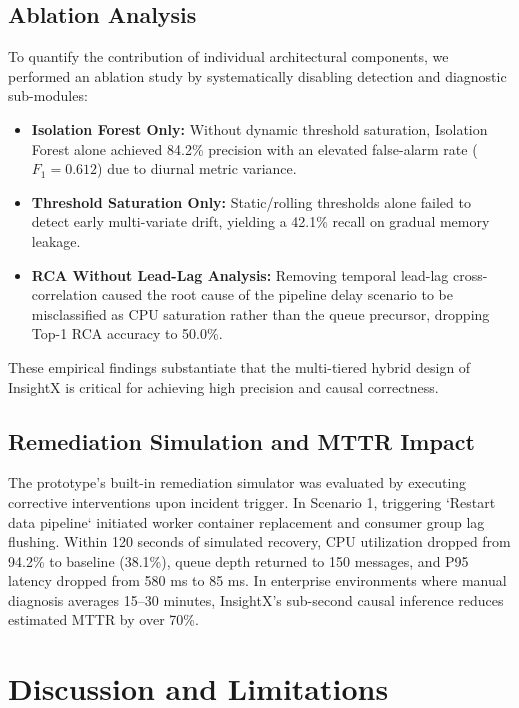 \documentclass[conference]{IEEEtran}
\begin{document}
\subsection{Ablation Analysis}
To quantify the contribution of individual architectural components, we performed an ablation study by systematically disabling detection and diagnostic sub-modules:
\begin{itemize}
    \item \textbf{Isolation Forest Only:} Without dynamic threshold saturation, Isolation Forest alone achieved 84.2\% precision with an elevated false-alarm rate ($F_1 = 0.612$) due to diurnal metric variance.
    \item \textbf{Threshold Saturation Only:} Static/rolling thresholds alone failed to detect early multi-variate drift, yielding a 42.1\% recall on gradual memory leakage.
    \item \textbf{RCA Without Lead-Lag Analysis:} Removing temporal lead-lag cross-correlation caused the root cause of the pipeline delay scenario to be misclassified as CPU saturation rather than the queue precursor, dropping Top-1 RCA accuracy to 50.0\%.
\end{itemize}
These empirical findings substantiate that the multi-tiered hybrid design of InsightX is critical for achieving high precision and causal correctness.

\subsection{Remediation Simulation and MTTR Impact}
The prototype's built-in remediation simulator was evaluated by executing corrective interventions upon incident trigger. In Scenario 1, triggering `Restart data pipeline` initiated worker container replacement and consumer group lag flushing. Within 120 seconds of simulated recovery, CPU utilization dropped from 94.2\% to baseline (38.1\%), queue depth returned to 150 messages, and P95 latency dropped from 580 ms to 85 ms. In enterprise environments where manual diagnosis averages 15--30 minutes, InsightX's sub-second causal inference reduces estimated MTTR by over 70\%.

\section{Discussion and Limitations}
\end{document}

